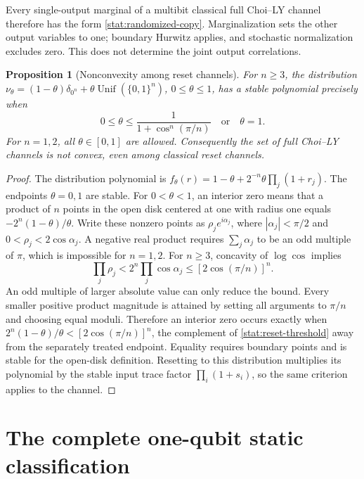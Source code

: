 \documentclass[reqno]{amsart}
\newtheorem{proposition}[theorem]{Proposition}
\theoremstyle{definition}
\theoremstyle{remark}
\begin{document}
Every single-output marginal of a multibit classical
full Choi--LY channel therefore has the form
\eqref{stat:randomized-copy}.  Marginalization sets the
other output variables to one; boundary Hurwitz applies,
and stochastic normalization excludes zero.  This does
not determine the joint output correlations.

\begin{proposition}[Nonconvexity among reset channels]
\label{stat:reset-nonconvex}
For \(n\ge3\), the distribution
\(\nu_\theta=(1-\theta)\delta_{0^n}
+\theta\operatorname{Unif}(\{0,1\}^n)\),
\(0\le\theta\le1\), has a stable polynomial precisely when
\begin{equation}
 0\le\theta\le\frac1{1+\cos^n(\pi/n)}
 \quad\text{or}\quad\theta=1.
 \label{stat:reset-threshold}
\end{equation}
For \(n=1,2\), all \(\theta\in[0,1]\) are allowed.
Consequently the set of full Choi--LY channels is not
convex, even among classical reset channels.
\end{proposition}

\begin{proof}
The distribution polynomial is
\(f_\theta(r)=1-\theta+2^{-n}\theta\prod_j(1+r_j)\).
The endpoints \(\theta=0,1\) are stable.  For
\(0<\theta<1\), an interior zero means that a product
of \(n\) points in the open disk centered at one with
radius one equals \(-2^n(1-\theta)/\theta\).
Write these nonzero points as
\(\rho_j e^{i\alpha_j}\), where
\(|\alpha_j|<\pi/2\) and
\(0<\rho_j<2\cos\alpha_j\).
A negative real product requires
\(\sum_j\alpha_j\) to be an odd multiple of \(\pi\),
which is impossible for \(n=1,2\).
For \(n\ge3\), concavity of \(\log\cos\) implies
\[
 \prod_j\rho_j
 <2^n\prod_j\cos\alpha_j
 \le[2\cos(\pi/n)]^n.
\]
An odd multiple of larger absolute value can only reduce
the bound.  Every smaller positive product magnitude is
attained by setting all arguments to \(\pi/n\) and
choosing equal moduli.  Therefore an interior zero occurs
exactly when
\(2^n(1-\theta)/\theta<[2\cos(\pi/n)]^n\), the
complement of \eqref{stat:reset-threshold} away from the
separately treated endpoint.  Equality requires boundary
points and is stable for the open-disk definition.
Resetting to this distribution multiplies its polynomial
by the stable input trace factor \(\prod_i(1+s_i)\),
so the same criterion applies to the channel.
\end{proof}


\section{The complete one-qubit static classification}\label{loc:section}
\end{document}
